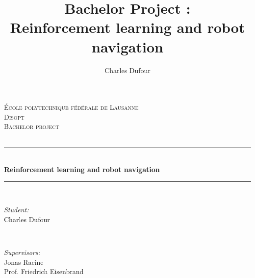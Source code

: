 \documentclass[14pt,a4paper]{article}
\author{Charles Dufour}
\title{Bachelor Project : \\
Reinforcement learning and robot navigation}
\theoremstyle{definition}
\begin{document}
\begin{titlepage}
\newcommand{\HRule}{\rule{\linewidth}{0.5mm}} %

\center %
 

\vspace{3cm}
\textsc{\LARGE \'Ecole polytechnique f\'ed\'erale de Lausanne}\\[0.5cm] %
\textsc{\large Disopt}\\[1.5cm] %
\textsc{\LARGE Bachelor project}\\[0.5cm] %
\textsc{\large }\\[0.5cm] %


\HRule \\[0.4cm]
{ \huge \bfseries Reinforcement learning and robot navigation}\\[0.4cm] %
\HRule \\[1.5cm]
 

\begin{minipage}{0.4\textwidth}
\begin{flushleft} \large
\emph{Student:}\\
Charles Dufour
\end{flushleft}
\end{minipage}
~
\begin{minipage}{0.4\textwidth}
\begin{flushright} \large
\emph{Supervisors:} \\
Jonas Racine\\%
Prof. Friedrich Eisenbrand 
\end{flushright}
\end{minipage}\\[5cm]


\end{titlepage}
\end{document}
